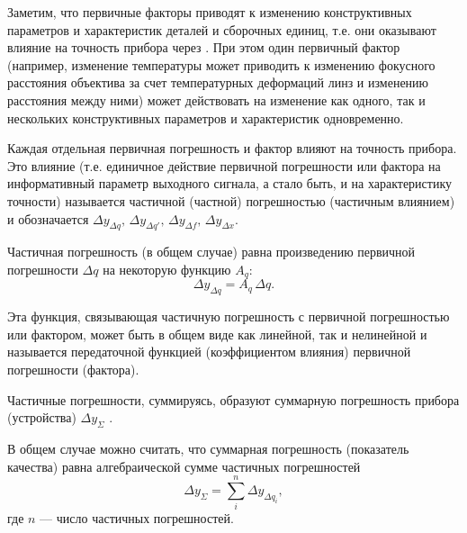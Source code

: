 Заметим, что первичные факторы   приводят к изменению конструктивных параметров и характеристик деталей и сборочных единиц, т.е. они оказывают влияние на точность прибора через  . При этом один первичный фактор (например, изменение температуры может приводить к изменению фокусного расстояния объектива за счет температурных деформаций линз и изменению расстояния между ними) может действовать на изменение как одного, так и нескольких конструктивных параметров и характеристик одновременно.

Каждая отдельная первичная погрешность и фактор влияют на точность прибора. Это влияние (т.е. единичное действие первичной погрешности или фактора на информативный параметр выходного сигнала, а стало быть, и на характеристику точности) называется частичной (частной) погрешностью (частичным влиянием) и обозначается $ \Delta y_{\Delta q},\,\Delta y_{\Delta q'},\,\Delta y_{\Delta f},\, \Delta y_{\Delta x} $.

Частичная погрешность (в общем случае) равна произведению первичной погрешности $ \Delta q $ на некоторую функцию $ A_q $:
\[ \Delta y_{\Delta q} = A_q\,\Delta q. \]

Эта функция, связывающая частичную погрешность с первичной погрешностью или фактором, может быть в общем виде как линейной, так и нелинейной и называется передаточной функцией (коэффициентом влияния) первичной погрешности (фактора).

Частичные погрешности, суммируясь, образуют суммарную погрешность прибора (устройства) $ \Delta y_\Sigma $ .

В общем случае можно считать, что суммарная погрешность (показатель качества) равна алгебраической сумме частичных погрешностей
\begin{equation}
\label{eq:10ysum}
\Delta y_\Sigma = \sum\limits_{i}^{n} \Delta y_{\Delta q_i},
\end{equation}
где $ n $ --- число частичных погрешностей.


